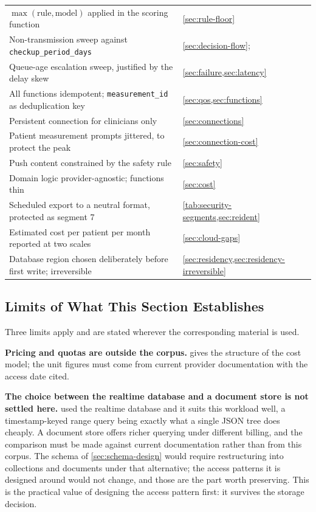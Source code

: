 \documentclass[12pt,a4paper,oneside]{report}
\begin{document}
\begin{table}[htbp]
\begin{tabularx}{\textwidth}{@{}X >{\raggedright\arraybackslash}p{4.8cm}@{}}
$\max(\text{rule},\text{model})$ applied in the scoring function & \cref{sec:rule-floor} \\
Non-transmission sweep against \texttt{checkup\_period\_days} & \cref{sec:decision-flow}; \textcite{yazdani2018} \\
Queue-age escalation sweep, justified by the delay skew & \cref{sec:failure,sec:latency} \\
All functions idempotent; \texttt{measurement\_id} as deduplication key & \cref{sec:qos,sec:functions} \\
Persistent connection for clinicians only & \cref{sec:connections} \\
Patient measurement prompts jittered, to protect the peak & \cref{sec:connection-cost} \\
Push content constrained by the safety rule & \cref{sec:safety} \\
Domain logic provider-agnostic; functions thin & \cref{sec:cost} \\
Scheduled export to a neutral format, protected as segment 7 & \cref{tab:security-segments,sec:reident} \\
Estimated cost per patient per month reported at two scales & \cref{sec:cloud-gaps} \\
Database region chosen deliberately before first write; irreversible & \cref{sec:residency,sec:residency-irreversible} \\
\bottomrule
\end{tabularx}
\end{table}

\subsection{Limits of What This Section Establishes}\label{sec:backend-limits}

Three limits apply and are stated wherever the corresponding material is used.

\textbf{Pricing and quotas are outside the corpus.}  gives the structure of the cost model; the unit figures must come from current provider documentation with the access date cited.

\textbf{The choice between the realtime database and a document store is not settled here.} \Textcite{efendi2025} used the realtime database and it suits this workload well, a timestamp-keyed range query being exactly what a single JSON tree does cheaply. A document store offers richer querying under different billing, and the comparison must be made against current documentation rather than from this corpus. The schema of \cref{sec:schema-design} would require restructuring into collections and documents under that alternative; the access patterns it is designed around would not change, and those are the part worth preserving. This is the practical value of designing the access pattern first: it survives the storage decision.
\end{document}
